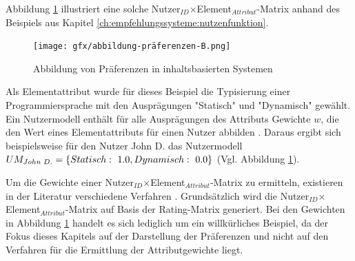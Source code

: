 Abbildung \ref{fig:empfehlungssysteme:preferences:abb1:2} illustriert eine solche Nutzer$_{ID}$$\times$Element$_{Attribut}$-Matrix anhand des Beispiels aus Kapitel \ref{ch:empfehlungssysteme:nutzenfunktion}.

\begin{figure}[H]
    \centering
	\texttt{[image: gfx/abbildung-präferenzen-B.png]}
	\caption[Abbildung von Präferenzen in inhaltsbasierten Systemen]{Abbildung von Präferenzen in inhaltsbasierten Systemen}
	\label{fig:empfehlungssysteme:preferences:abb1:2}
\end{figure}

Als Elementattribut wurde für dieses Beispiel die Typisierung einer Programmiersprache mit den Ausprägungen "Statisch" und "Dynamisch" gewählt.
Ein Nutzermodell enthält für alle Ausprägungen des Attributs Gewichte $w$, die den Wert eines Elementattributs für einen Nutzer abbilden \cite[S. 251]{berkovsky:article}.
Daraus ergibt sich beispielsweise für den Nutzer John D. das Nutzermodell $UM_{John\textnormal{ }D.} = \{Statisch:\textnormal{ 1.0}, Dynamisch: \textnormal{ 0.0}\}$ (Vgl. Abbildung \ref{fig:empfehlungssysteme:preferences:abb1:2}).

Um die Gewichte einer Nutzer$_{ID}$$\times$Element$_{Attribut}$-Matrix zu ermitteln, existieren in der Literatur verschiedene Verfahren \cite[S. 42]{berkovsky:2:article}.
Grundsätzlich wird die Nutzer$_{ID}$$\times$Element$_{Attribut}$-Matrix auf Basis der Rating-Matrix generiert.
Bei den Gewichten in Abbildung \ref{fig:empfehlungssysteme:preferences:abb1:2} handelt es sich lediglich um ein willkürliches Beispiel, da der Fokus dieses Kapitels auf der Darstellung der Präferenzen und nicht auf den Verfahren für die Ermittlung der Attributgewichte liegt.

